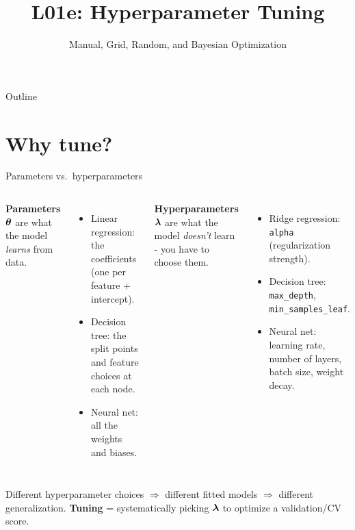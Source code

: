 \documentclass[aspectratio=169]{beamer}
\title{L01e: Hyperparameter Tuning}
\subtitle{Manual, Grid, Random, and Bayesian Optimization}
\date{}
\begin{document}
\begin{frame}{Outline}
  \tableofcontents
\end{frame}

\section{Why tune?}

\begin{frame}{Parameters vs.\ hyperparameters}
  \begin{columns}[T]
    \textbf{Parameters $\bm{\theta}$} are what the model \emph{learns} from data.
    \begin{itemize}\small
      \item Linear regression: the coefficients (one per feature + intercept).
      \item Decision tree: the split points and feature choices at each node.
      \item Neural net: all the weights and biases.
    \end{itemize}
    \textbf{Hyperparameters $\bm{\lambda}$} are what the model \emph{doesn't} learn - you have to choose them.
    \begin{itemize}\small
      \item Ridge regression: \texttt{alpha} (regularization strength).
      \item Decision tree: \texttt{max\_depth}, \texttt{min\_samples\_leaf}.
      \item Neural net: learning rate, number of layers, batch size, weight decay.
    \end{itemize}
  \end{columns}
  \vfill
  Different hyperparameter choices $\Rightarrow$ different fitted models $\Rightarrow$ different generalization. \textbf{Tuning} = systematically picking $\bm{\lambda}$ to optimize a validation/CV score.
\end{frame}
\end{document}
